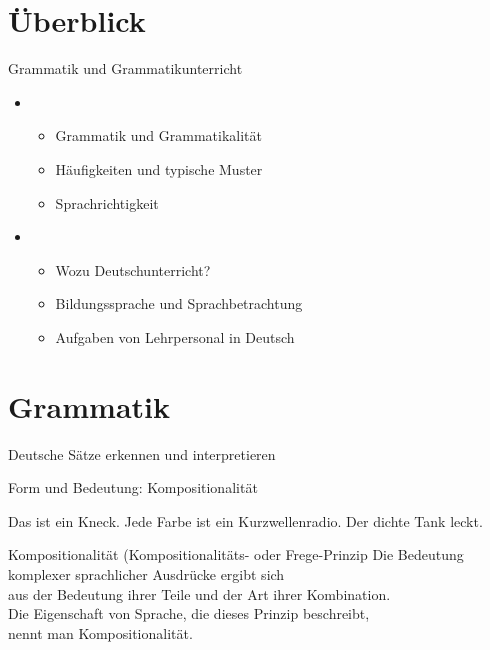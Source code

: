 \section{Überblick}

\begin{frame}
  {Grammatik und Grammatikunterricht}
  \onslide<+->
  \begin{itemize}[<+->]
    \item {}
      \begin{itemize}
        \item Grammatik und Grammatikalität
        \item Häufigkeiten und typische Muster
        \item Sprachrichtigkeit
      \end{itemize}
      \Zeile
    \item {}
      \begin{itemize}
        \item Wozu Deutschunterricht?
        \item Bildungssprache und Sprachbetrachtung
        \item Aufgaben von Lehrpersonal in Deutsch
      \end{itemize}
  \end{itemize}
\end{frame}


\section{Grammatik}

\begin{frame}
  {Deutsche Sätze erkennen und interpretieren}
  \onslide<+->
  \onslide<+->
  \begin{exe}
    \onslide<+->
    \onslide<+->
    \onslide<+->
    \onslide<+->
    \Zeile
  \end{exe}
\end{frame}


\begin{frame}
  {Form und Bedeutung: Kompositionalität}
  \onslide<+->
  \onslide<+->
  \begin{exe}
    \ex Das ist ein Kneck.
    \onslide<+->
    \Zeile
  \ex Jede Farbe ist ein Kurzwellenradio.
  \ex Der dichte Tank leckt.
\end{exe}
    \Zeile
  \onslide<+->

  \Large\begin{block}{Kompositionalität (Kompositionalitäts- oder Frege-Prinzip}
    Die Bedeutung komplexer sprachlicher Ausdrücke ergibt sich\\
    aus der Bedeutung ihrer Teile und der Art ihrer Kombination.\\

    Die Eigenschaft von Sprache, die dieses Prinzip beschreibt,\\
    nennt man Kompositionalität.
  \end{block}
\end{frame}

